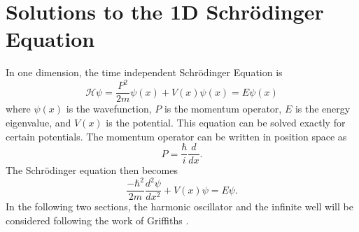 \chapter{Solutions to the 1D Schr\"odinger Equation} \label{section:appendixA}
In one dimension, the time independent Schr\"odinger Equation is
\begin{equation}
    \mathcal{H}\psi=\frac{P^2}{2m}\psi(x)+V(x)\psi(x)=E\psi(x)
\end{equation}
where $\psi(x)$ is the wavefunction, $P$ is the momentum operator, $E$ is the energy eigenvalue, and $V(x)$ is the potential. This equation can be solved exactly for certain potentials. The momentum operator can be written in position space as 
\begin{equation}
P=\frac{\hbar}{i}\frac{d}{dx}.
\end{equation}
The Schr\"odinger equation then becomes
\begin{equation}
    \frac{-\hbar^2}{2m}\frac{d^2 \psi}{dx^2} + V(x) \psi=E\psi.
\end{equation}
In the following two sections, the harmonic oscillator and the infinite well will be considered following the work of Griffiths \cite{Griffiths}.
